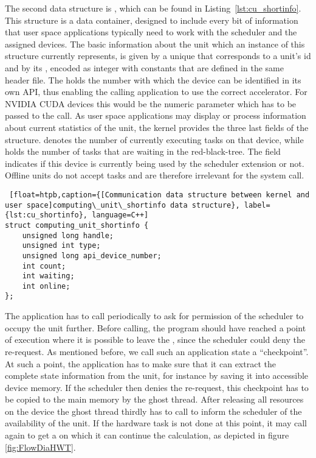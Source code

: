 The second data structure is , which can be found in Listing~\ref{lst:cu_shortinfo}. This structure is a data container, designed to include every bit of information that user space applications typically need to work with the scheduler and the assigned devices.
The basic information about the unit which an instance of this structure currently represents, is given by a unique  that corresponds to a unit's id and by its , encoded as integer with constants that are defined in the same header file. The  holds the number with which the device can be identified in its own API, thus enabling the calling application to use the correct accelerator. For NVIDIA CUDA devices this would be the numeric parameter which has to be passed to the  call. As user space applications may display or process information about current statistics of the unit, the kernel provides the three last fields of the structure.  denotes the number of currently executing tasks on that device, while  holds the number of tasks that are waiting in the red-black-tree. The field  indicates if this device is currently being used by the scheduler extension or not. Offline units do not accept tasks and are therefore irrelevant for the  system call.

\begin{lstlisting} [float=htpb,caption={[Communication data structure between kernel and user space]computing\_unit\_shortinfo data structure}, label={lst:cu_shortinfo}, language=C++]
struct computing_unit_shortinfo {
	unsigned long handle;
	unsigned int type;
	unsigned long api_device_number;
	int count;
	int waiting;
	int online;
};
\end{lstlisting}

The application has to call  periodically to ask for permission of the scheduler to occupy the unit further. Before calling, the program should have reached a point of execution where it is possible to leave the \cu{}, since the scheduler could deny the re-request. As mentioned before, we call such an application state a ``checkpoint''. At such a point, the application has to make sure that it can extract the complete state information from the unit, for instance by saving it into accessible device memory. If the scheduler then denies the re-request, this checkpoint has to be copied to the main memory by the ghost thread. After releasing all resources on the device the ghost thread thirdly has to call  to inform the scheduler of the availability of the unit. If the hardware task is not done at this point, it may call  again to get a \cu{} on which it can continue the calculation, as depicted in figure \ref{fig:FlowDiaHWT}.

